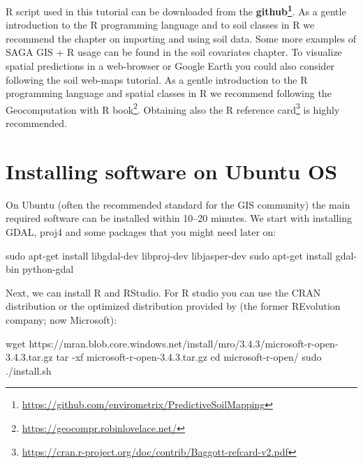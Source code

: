 \documentclass[11pt]{krantz}
\newenvironment{Shaded}{\begin{snugshade}}{\end{snugshade}}
\newcommand{\BuiltInTok}[1]{#1}
\newcommand{\FunctionTok}[1]{\textcolor[rgb]{0,0,0}{#1}}
\newcommand{\NormalTok}[1]{#1}
\renewcommand{\href}[2]{#2\footnote{\url{#1}}}
\theoremstyle{definition}
\theoremstyle{definition}
\theoremstyle{definition}
\theoremstyle{remark}
\begin{document}
R script used in this tutorial can be downloaded from the
\textbf{\href{https://github.com/envirometrix/PredictiveSoilMapping}{github}}.
As a gentle introduction to the R programming language and to soil
classes in R we recommend the chapter on importing and using soil data.
Some more examples of SAGA GIS + R usage can be found in the soil
covariates chapter. To visualize spatial predictions in a web-browser or
Google Earth you could also consider following the soil web-maps
tutorial. As a gentle introduction to the R programming language and
spatial classes in R we recommend following
\href{https://geocompr.robinlovelace.net/}{the Geocomputation with R
book}. Obtaining also the
\href{https://cran.r-project.org/doc/contrib/Baggott-refcard-v2.pdf}{R
reference card} is highly recommended.

\hypertarget{installing-software-on-ubuntu-os}{%
\section{Installing software on Ubuntu
OS}\label{installing-software-on-ubuntu-os}}

On Ubuntu (often the recommended standard for the GIS community) the
main required software can be installed within 10--20 minutes. We start
with installing GDAL, proj4 and some packages that you might need later
on:

\begin{Shaded}
\begin{Highlighting}[]
\FunctionTok{sudo}\NormalTok{ apt-get install libgdal-dev libproj-dev libjasper-dev}
\FunctionTok{sudo}\NormalTok{ apt-get install gdal-bin python-gdal}
\end{Highlighting}
\end{Shaded}

Next, we can install R and RStudio. For R studio you can use the CRAN
distribution or the optimized distribution provided by (the former
REvolution company; now Microsoft):

\begin{Shaded}
\begin{Highlighting}[]
\FunctionTok{wget}\NormalTok{ https://mran.blob.core.windows.net/install/mro/3.4.3/microsoft-r-open-3.4.3.tar.gz}
\FunctionTok{tar}\NormalTok{ -xf microsoft-r-open-3.4.3.tar.gz}
\BuiltInTok{cd}\NormalTok{ microsoft-r-open/}
\FunctionTok{sudo}\NormalTok{ ./install.sh}
\end{Highlighting}
\end{Shaded}
\end{document}
